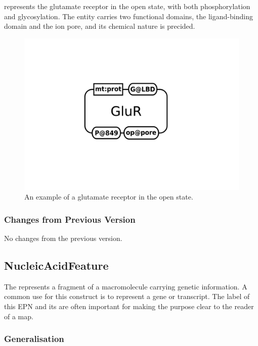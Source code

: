  represents the glutamate receptor in the open state, with both phosphorylation and glycosylation.  The entity carries two functional domains, the ligand-binding domain and the ion pore, and its chemical nature is precided.

\begin{figure}[H]
  \centering
  \includegraphics[scale = 0.3]{examples/macromolecule-GluR}
  \caption{An example of a glutamate receptor in the open state.}
  \label{fig:example-glur}
\end{figure}


\subsubsection{Changes from Previous Version}

No changes from the previous version.

\subsection{NucleicAcidFeature}
\label{sec:genetic}

The  represents a fragment of a
macromolecule carrying genetic information.  A common use for this
construct is to represent a gene or transcript.  The label of this EPN
and its  are often important for making the purpose
clear to the reader of a map.

\subsubsection{Generalisation}

